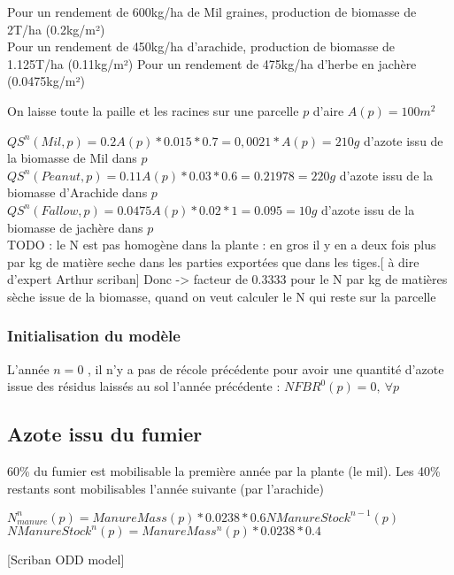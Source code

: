 \documentclass[10pt,a4paper,french]{article} %
\begin{document}
Pour un rendement de 600kg/ha de Mil graines, production de biomasse de 2T/ha (0.2kg/m²)\\
Pour un rendement de 450kg/ha d'arachide, production de biomasse de 1.125T/ha (0.11kg/m²)
Pour un rendement de 475kg/ha d'herbe en jachère (0.0475kg/m²) 



On laisse toute la paille et les racines sur une parcelle $p$ d'aire $A(p)=100m^2$


$QS^{n}(Mil, p)= 0.2 A(p)* 0.015 * 0.7 = 0,0021* A(p)= 210g$ d'azote issu de la biomasse de Mil dans $p$ \\
$QS^{n}(Peanut, p)= 0.11 A(p) * 0.03 * 0.6 = 0.21978 = 220g$ d'azote issu de la biomasse d'Arachide  dans $p$\\
$QS^{n}(Fallow, p)= 0.0475 A(p)* 0.02 * 1 = 0.095 = 10g$ d'azote issu de la biomasse de jachère  dans $p$ \\



TODO : le N est pas homogène dans la plante : en gros il y en a deux fois plus par kg de matière seche dans les parties exportées que dans les tiges.[ à dire d'expert Arthur scriban]
Donc -> facteur de 0.3333 pour le N par kg de matières sèche  issue de la biomasse, quand on veut calculer le N qui reste sur la parcelle



\subsubsection{Initialisation du modèle}


L'année $n=0$ , il n'y a pas de récole précédente pour  avoir une quantité d'azote issue des résidus laissés au sol l'année précédente  : $NFBR^0(p)=0,\  \forall p$





\subsection{Azote issu du fumier}


60\% du fumier est mobilisable la première année par la plante (le mil).
Les 40\% restants sont mobilisables l'année suivante (par l'arachide)


$N_{manure}^n(p)= ManureMass(p) * 0.0238 * 0.6 NManureStock^{n-1}(p)$
$NManureStock^{n}(p) = ManureMass^n(p)*  0.0238 * 0.4 $




[Scriban ODD model]
\end{document}
